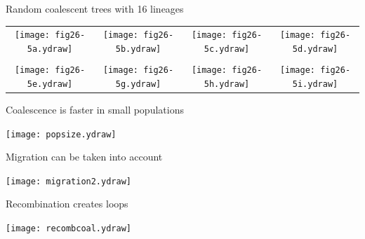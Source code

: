\documentclass[bluish,slideColor,colorBG,pdf]{prosper}
\begin{document}
\begin{slide}[Replace]{Random coalescent trees with 16 lineages }
\bigskip

\begin{tabular}{c c c c}
\texttt{[image: fig26-5a.ydraw]} &
\texttt{[image: fig26-5b.ydraw]} &
\texttt{[image: fig26-5c.ydraw]} &
\texttt{[image: fig26-5d.ydraw]}\\ 
& & & \\
\texttt{[image: fig26-5e.ydraw]} &
\texttt{[image: fig26-5g.ydraw]} &
\texttt{[image: fig26-5h.ydraw]} &
\texttt{[image: fig26-5i.ydraw]}
\end{tabular}

\end{slide}

\begin{slide}[Replace]{Coalescence is faster in small populations}

\centerline{\texttt{[image: popsize.ydraw]}}

\end{slide}

\begin{slide}[Replace]{Migration can be taken into account}

\centerline{\texttt{[image: migration2.ydraw]}}

\end{slide}

\begin{slide}[Replace]{Recombination creates loops}

\centerline{\texttt{[image: recombcoal.ydraw]}}

\end{slide}
\end{document}
